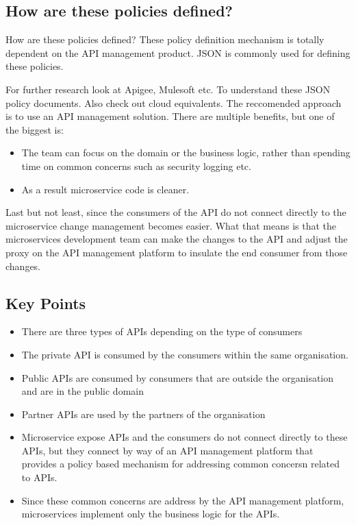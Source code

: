 \documentclass[a4paper, 11pt]{book}
\begin{document}
    \subsection{How are these policies defined?}
    How are these policies defined?
    These policy definition mechanism is totally dependent on the API management product.
    JSON is commonly used for defining these policies.

    For further research look at Apigee, Mulesoft etc.
    To understand these JSON policy documents. Also check out cloud equivalents.
    The reccomended approach is to use an API management solution.
    There are multiple benefits, but one of the biggest is:
    \begin{itemize}
        \item The team can focus on the domain or the business logic, rather than spending time on common concerns such as security logging etc.
        \item As a result microservice code is cleaner.
    \end{itemize}

    Last but not least, since the consumers of the API do not connect directly to the microservice change management becomes easier.
    What that means is that the microservices development team can make the changes to the API and adjust the proxy on the API management platform to insulate the end consumer from those changes.

    \subsection{Key Points}
    \begin{itemize}
        \item There are three types of APIs depending on the type of consumers
        \item The private API is consumed by the consumers within the same organisation.
        \item Public APIs are consumed by consumers that are outside the organisation and are in the public domain
        \item Partner APIs are used by the partners of the organisation
        \item Microservice expose APIs and the consumers do not connect directly to these APIs, but they connect by way of an API management platform that provides a policy based mechanism for addressing common concersn related to APIs.
        \item Since these common concerns are address by the API management platform, microservices implement only the business logic for the APIs.
    \end{itemize}
\end{document}
